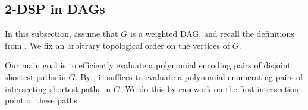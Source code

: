 \documentclass[11pt]{article}
\newcommand{\ca}{\mathcal}
\theoremstyle{definition}
\begin{document}

\subsection{2-DSP in DAGs}
\label{subsec:2dsp-DAG-alg}

In this subsection, assume that $G$ is a weighted DAG, and recall the definitions from .
We fix an arbitrary topological order on the vertices of $G$.

Our main goal is to efficiently evaluate a polynomial encoding pairs of disjoint shortest paths in $G$.
By , it suffices to evaluate a polynomial enumerating pairs of intersecting shortest paths in $G$.
We do this by casework on the first intersection point of these paths. 
\end{document}
